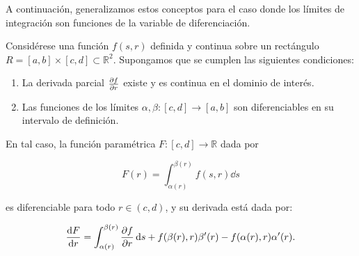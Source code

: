 \documentclass[12pt, a4paper, oneside, spanish]{book}
\begin{document}
A continuación, generalizamos estos conceptos para el caso donde los límites de integración son funciones de la variable de diferenciación.

\begin{theorem}\label{thm:leibniz-general}

  Considérese una función \( f(s,r) \) definida y continua sobre un rectángulo \( R = [a,b]\times [c,d] \subset \mathbb{R}^2 \). Supongamos que se cumplen las siguientes condiciones:

  \begin{enumerate}
  \item\label{item:1} La derivada parcial \( \pdv{f}{r} \) existe y es continua en el dominio de interés.
  \item\label{item:2} Las funciones de los límites \( \alpha, \beta : [c,d] \to [a,b] \) son diferenciables en su intervalo de definición.
  \end{enumerate}

  En tal caso, la función paramétrica \( F:[c,d] \to \mathbb{R} \) dada por

  \[ F(r) = \int_{\alpha(r)}^{\beta(r)} f(s,r) \dd{s} \]

  es diferenciable para todo \( r \in (c,d) \), y su derivada está dada por:

  \begin{equation}
    \label{eq:leibniz-int}
   \dv{F}{r} = \int_{\alpha(r)}^{\beta(r)} \pdv{f}{r}(s,r) \dd{s} + f(\beta(r),r)\beta'(r) - f(\alpha(r),r)\alpha'(r).
  \end{equation}

\end{theorem}
\end{document}
